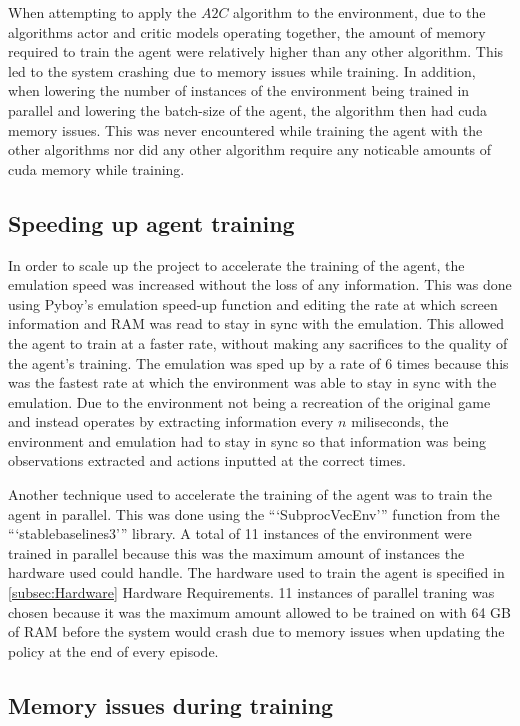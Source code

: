 When attempting to apply the $A2C$ algorithm to the environment, due to the algorithms actor and critic models operating together, the amount of memory required to train the agent were relatively higher than any other algorithm. This led to the system crashing due to memory issues while training. In addition, when lowering the number of instances of the environment being trained in parallel and lowering the batch-size of the agent, the algorithm then had cuda memory issues. This was never encountered while training the agent with the other algorithms nor did any other algorithm require any noticable amounts of cuda memory while training.

\subsection{Speeding up agent training}

In order to scale up the project to accelerate the training of the agent, the emulation speed was increased without the loss of any information. This was done using Pyboy's emulation speed-up function and editing the rate at which screen information and RAM was read to stay in sync with the emulation. This allowed the agent to train at a faster rate, without making any sacrifices to the quality of the agent's training. The emulation was sped up by a rate of 6 times because this was the fastest rate at which the environment was able to stay in sync with the emulation. Due to the environment not being a recreation of the original game and instead operates by extracting information every $n$ miliseconds, the environment and emulation had to stay in sync so that information was being observations extracted and actions inputted at the correct times.

Another technique used to accelerate the training of the agent was to train the agent in parallel. This was done using the ```SubprocVecEnv''' function from the ```stablebaselines3''' library. A total of 11 instances of the environment were trained in parallel because this was the maximum amount of instances the hardware used could handle. The hardware used to train the agent is specified in \ref{subsec:Hardware} Hardware Requirements. 11 instances of parallel traning was chosen because it was the maximum amount allowed to be trained on with 64 GB of RAM before the system would crash due to memory issues when updating the policy at the end of every episode. 

\subsection{Memory issues during training}

